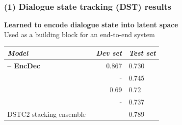\documentclass[10pt, compress,british,xcolor={svgnames,dvipsnames,x11names},trans]{beamer}
\begin{document}
\begin{frame}\frametitle{(1) Dialogue state tracking (DST) results}
\begin{center}


    {\bf Learned to encode dialogue state into latent space} \\
        Used as a building block for an end-to-end system
    \vfill
\begin{tabular}{l@{\quad}rll}
\hline
\multicolumn{1}{l}{\rule{0pt}{12pt}
                   {\it Model}}&\multicolumn{1}{l}{\it Dev set}&\multicolumn{2}{l}{\it Test set}\\[2pt]
\hline\rule{0pt}{12pt}
    {\bf \citet{platek_recurrent_2016} -- EncDec} &   0.867 & 0.730 \\
\hline
    \citet{vodolan_hybrid_2015} & - & 0.745 \\
    \citet{zilka_incremental_2015} & 0.69 & 0.72 \\
    \citet{henderson2013deep} & - & 0.737 \\
\hline
    DSTC2 stacking ensemble~\cite{henderson2014second} & - & 0.789 \\
\hline
\end{tabular}
\end{center}
\end{frame}
\end{document}
